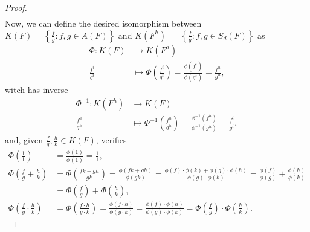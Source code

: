 \documentclass[11pt,a4paper]{article}
\begin{document}
\begin{proof}
\begin{align*}
  \end{align*}
  Now, we can define the desired isomorphism between $ K(F) = \left\{\frac{f}{g}: f, g \in A(F)\right\} $ and $ K(F^h) = $ $ \left\{\frac{f}{g}: f, g \in S_d(F)\right\} $ as
  \begin{align*}
    \Phi: K(F) &\longrightarrow K(F^h) \\
    \frac{f^i}{g^i} &\longmapsto \Phi \left(\frac{f^i}{g^i}\right)= \frac{\phi(f^i)}{\phi(g^i)} = \frac{f^h}{g^h},
  \end{align*}
  witch has inverse
  \begin{align*}
    \Phi^{-1}: K(F^h) &\longrightarrow K(F) \\
    \frac{f^h}{g^h} &\longmapsto \Phi^{-1} \left(\frac{f^h}{g^h}\right)= \frac{\phi^{-1}(f^h)}{\phi^{-1}(g^h)} = \frac{f^i}{g^i},
  \end{align*}
  and, given $ \frac{f}{g}, \frac{h}{k} \in K(F) $, verifies
  \begin{align*}
    \Phi(\frac{1}{1}) &= \frac{\phi(1)}{\phi(1)} = \frac{1}{1}, \\
    \Phi(\frac{f}{g} + \frac{h}{k}) &= \Phi(\frac{fk + gh}{gk}) = \frac{\phi(fk + gh)}{\phi(gk)} = \frac{\phi(f) \cdot \phi(k) + \phi(g) \cdot\phi(h)}{\phi(g) \cdot \phi(k)} = \frac{\phi(f)}{\phi(g)} + \frac{\phi(h)}{\phi(k)} \\
    &= \Phi(\frac{f}{g}) + \Phi(\frac{h}{k}), \\
    \Phi(\frac{f}{g} \cdot \frac{h}{k}) &= \Phi(\frac{f\cdot h}{g \cdot k}) = \frac{\phi(f\cdot h)}{\phi(g \cdot k)} = \frac{\phi(f) \cdot \phi(h)}{\phi(g) \cdot \phi(k)} = \Phi(\frac{f}{g})\cdot \Phi(\frac{h}{k}).
  \end{align*}
\end{proof}
\end{document}
